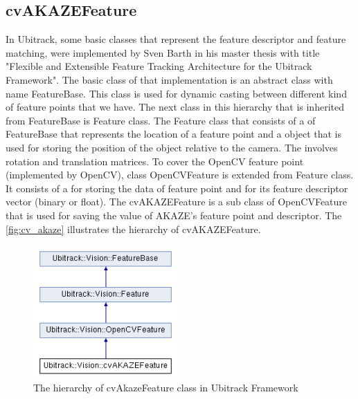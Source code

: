 \subsection {cvAKAZEFeature}
In Ubitrack, some basic classes that represent the feature descriptor and feature matching, were implemented by Sven Barth in his master thesis with title "Flexible and Extensible Feature Tracking Architecture for the Ubitrack Framework". The basic class of that implementation is an abstract class with name FeatureBase. This class is used for dynamic casting between different kind of feature points that we have.
The next class in this hierarchy that is inherited from FeatureBase is Feature class. The Feature class that consists of a   of FeatureBase that represents the location of a feature point and a  object that is used for storing the position of the object relative to the camera. The  involves rotation and translation matrices. To cover the OpenCV feature point (implemented by OpenCV), class OpenCVFeature is extended from Feature class. It consists of a  for storing the data of feature point and  for its feature descriptor vector (binary or float). The cvAKAZEFeature is a sub class of OpenCVFeature that is used for saving the value of AKAZE's feature point and descriptor. The \autoref{fig:cv_akaze} illustrates the hierarchy of cvAKAZEFeature.

\begin{figure}[H]
  \centering
  \includegraphics[width=55mm]{figures/cv_akaze}
  \caption{The hierarchy of cvAkazeFeature class in Ubitrack Framework}\label{fig:cv_akaze}
\end{figure}
 
